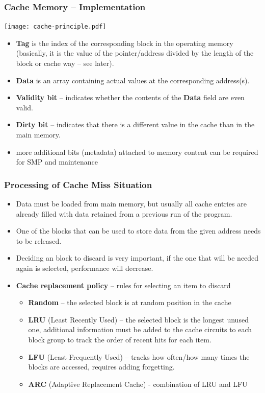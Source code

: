 \documentclass{beamer}
\begin{document}
\begin{frame}[shrink=1]
\frametitle{Cache Memory -- Implementation}
{
\centering

\texttt{[image: cache-principle.pdf]}

}
\vskip 2mm

\begin{itemize}
\item \textbf{Tag} is the index of the corresponding block in the operating memory (basically, it is the value of the pointer/address divided by the length of the block or cache way -- see later).
\item \textbf{Data} is an array containing actual values at the corresponding address(s).
\item \textbf{Validity bit} – indicates whether the contents of the \textbf{Data} field are even valid.
\item \textbf{Dirty bit} –  indicates that there is a different value in the cache than in the main memory.
\item more additional bits (metadata) attached to memory content can be required for SMP and maintenance
\end{itemize}

\end{frame}


\begin{frame}
\frametitle{Processing of Cache Miss Situation}

\begin{itemize}
\item Data must be loaded from main memory, but usually all cache entries are already filled with data retained from a previous run of the program.
\item One of the blocks that can be used to store data from the given address needs to be released.
\item Deciding an block to discard is very important, if the one that will be needed again is selected, performance will decrease.
\item \textbf{Cache replacement policy} -- rules for selecting an item to discard
\begin{itemize}
\item \textbf{Random} -- the selected block is at random position in the cache
\item \textbf{LRU} (Least Recently Used) -- the selected block is the longest unused one, additional information must be added to the cache circuits to each block group to track the order of recent hits for each item.
\item \textbf{LFU} (Least Frequently Used) -- tracks how often/how many times the blocks are accessed, requires adding forgetting.
\item \textbf{ARC} (Adaptive Replacement Cache) - combination of LRU and LFU
\end{itemize}
\end{itemize}

\end{frame}
\end{document}
